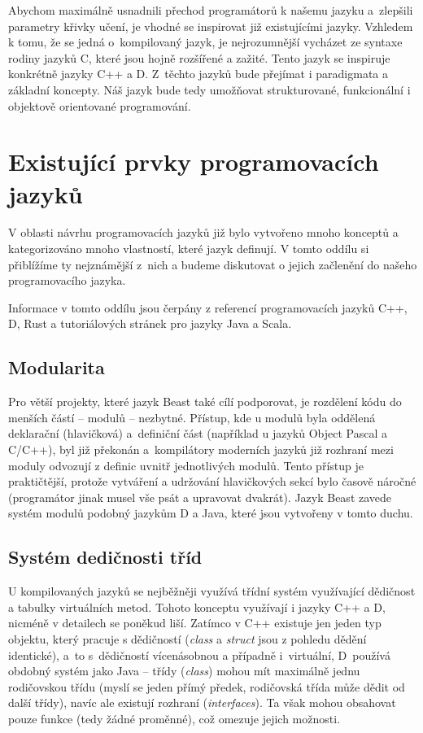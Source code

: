 Abychom maximálně usnadnili přechod programátorů k našemu jazyku a~zlepšili parametry křivky učení, je vhodné se inspirovat již existujícími jazyky. Vzhledem k tomu, že se jedná o~kompilovaný jazyk, je nejrozumnější vycházet ze syntaxe rodiny jazyků C, které jsou hojně rozšířené a zažité. Tento jazyk se inspiruje konkrétně jazyky C++ a D. Z~těchto jazyků bude přejímat i paradigmata a základní koncepty. Náš jazyk bude tedy umožňovat strukturované, funkcionální i objektově orientované programování.

\section{Existující prvky programovacích jazyků}
V oblasti návrhu programovacích jazyků již bylo vytvořeno mnoho konceptů a kategorizováno mnoho vlastností, které jazyk definují. V tomto oddílu si přiblížíme ty nejznámější z~nich a budeme diskutovat o jejich začlenění do našeho programovacího jazyka.

Informace v tomto oddílu jsou čerpány z referencí programovacích jazyků C++\cite{CppRef}, D\cite{DSpec}, Rust\cite{RustRef} a tutoriálových stránek pro jazyky Java\cite{JavaTut} a Scala\cite{ScalaTut}.

\subsection{Modularita}
Pro větší projekty, které jazyk Beast také cílí podporovat, je rozdělení kódu do menších částí -- modulů -- nezbytné. Přístup, kde u modulů byla oddělená deklarační (hlavičková) a~definiční část (například u jazyků Object Pascal a C/C++), byl již překonán a~kompilátory moderních jazyků již rozhraní mezi moduly odvozují z definic uvnitř jednotlivých modulů. Tento přístup je praktičtější, protože vytváření a udržování hlavičkových sekcí bylo časově náročné (programátor jinak musel vše psát a upravovat dvakrát). Jazyk Beast zavede systém modulů podobný jazykům D a Java, které jsou vytvořeny v tomto duchu.

\subsection{Systém dedičnosti tříd} U kompilovaných jazyků se nejběžněji využívá třídní systém využívající dědičnost a tabulky virtuálních metod. Tohoto konceptu využívají i jazyky C++ a D, nicméně v detailech se poněkud liší. Zatímco v C++ existuje jen jeden typ objektu, který pracuje s dědičností (\textit{class} a \textit{struct} jsou z pohledu dědění identické), a~to s~dědičností vícenásobnou a případně i~virtuální, D~používá obdobný systém jako Java -- třídy (\textit{class}) mohou mít maximálně jednu rodičovskou třídu (myslí se jeden přímý předek, rodičovská třída může dědit od další třídy), navíc ale existují rozhraní (\textit{interfaces}). Ta však mohou obsahovat pouze funkce (tedy žádné proměnné), což omezuje jejich možnosti.


